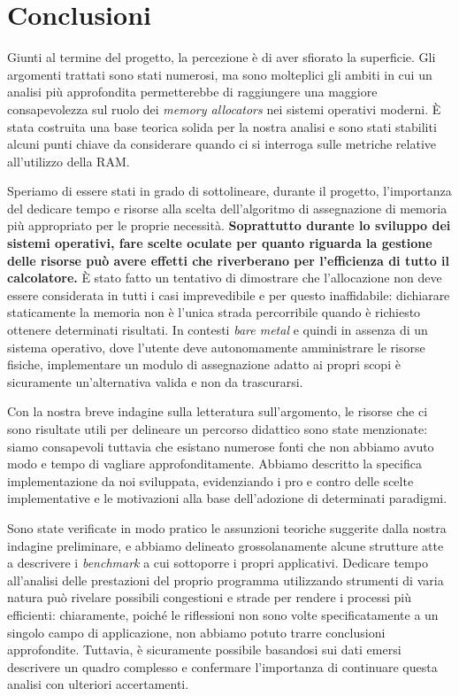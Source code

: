 \chapter{Conclusioni}

Giunti al termine del progetto, la percezione è di aver sfiorato la superficie. Gli argomenti trattati sono stati numerosi, ma sono molteplici gli ambiti in cui un analisi più approfondita permetterebbe di raggiungere una maggiore consapevolezza sul ruolo dei \textit{memory allocators} nei sistemi operativi moderni. È stata costruita una base teorica solida per la nostra analisi e sono stati stabiliti alcuni punti chiave da considerare quando ci si interroga sulle metriche relative all'utilizzo della RAM.

Speriamo di essere stati in grado di sottolineare, durante il progetto, l'importanza del dedicare tempo e risorse alla scelta dell'algoritmo di assegnazione di memoria più appropriato per le proprie necessità. \textbf{Soprattutto durante lo sviluppo dei sistemi operativi, fare scelte oculate per quanto riguarda la gestione delle risorse può avere effetti che riverberano per l'efficienza di tutto il calcolatore.} È stato fatto un tentativo di dimostrare che l’allocazione non deve essere considerata in tutti i casi imprevedibile e per questo inaffidabile: dichiarare staticamente la memoria non è l'unica strada percorribile quando è richiesto ottenere determinati risultati. In contesti \textit{bare metal} e quindi in assenza di un sistema operativo, dove l'utente deve autonomamente amministrare le risorse fisiche, implementare un modulo di assegnazione adatto ai propri scopi è sicuramente un'alternativa valida e non da trascurarsi.

Con la nostra breve indagine sulla letteratura sull’argomento, le risorse che ci sono risultate utili per delineare un percorso didattico sono state menzionate: siamo consapevoli tuttavia che esistano numerose fonti che non abbiamo avuto modo e tempo di vagliare approfonditamente. Abbiamo descritto la specifica implementazione da noi sviluppata, evidenziando i pro e contro delle scelte implementative e le motivazioni alla base dell’adozione di determinati paradigmi. 

Sono state verificate in modo pratico le assunzioni teoriche suggerite dalla nostra indagine preliminare, e abbiamo delineato grossolanamente alcune strutture atte a descrivere i \textit{benchmark} a cui sottoporre i propri applicativi. Dedicare tempo all'analisi delle prestazioni del proprio programma utilizzando strumenti di varia natura può rivelare possibili congestioni e strade per rendere i processi più efficienti: chiaramente, poiché le riflessioni non sono volte specificatamente a un singolo campo di applicazione, non abbiamo potuto trarre conclusioni approfondite. Tuttavia, è sicuramente possibile basandosi sui dati emersi descrivere un quadro complesso e confermare l'importanza di continuare questa analisi con ulteriori accertamenti.

